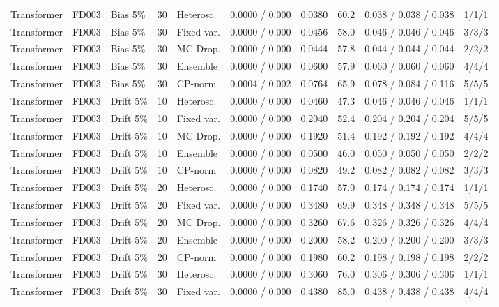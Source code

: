 \documentclass[10pt,a4paper]{article}
\begin{document}
\begin{landscape}
\begin{center}
\begin{longtable}{lllllcclll}
Transformer & FD003 & Bias 5\% & 30 & Heterosc. & 0.0000 / 0.000 & 0.0380 & 60.2 & 0.038 / 0.038 / 0.038 & 1/1/1 \\
Transformer & FD003 & Bias 5\% & 30 & Fixed var. & 0.0000 / 0.000 & 0.0456 & 58.0 & 0.046 / 0.046 / 0.046 & 3/3/3 \\
Transformer & FD003 & Bias 5\% & 30 & MC Drop. & 0.0000 / 0.000 & 0.0444 & 57.8 & 0.044 / 0.044 / 0.044 & 2/2/2 \\
Transformer & FD003 & Bias 5\% & 30 & Ensemble & 0.0000 / 0.000 & 0.0600 & 57.9 & 0.060 / 0.060 / 0.060 & 4/4/4 \\
Transformer & FD003 & Bias 5\% & 30 & CP-norm & 0.0004 / 0.002 & 0.0764 & 65.9 & 0.078 / 0.084 / 0.116 & 5/5/5 \\
Transformer & FD003 & Drift 5\% & 10 & Heterosc. & 0.0000 / 0.000 & 0.0460 & 47.3 & 0.046 / 0.046 / 0.046 & 1/1/1 \\
Transformer & FD003 & Drift 5\% & 10 & Fixed var. & 0.0000 / 0.000 & 0.2040 & 52.4 & 0.204 / 0.204 / 0.204 & 5/5/5 \\
Transformer & FD003 & Drift 5\% & 10 & MC Drop. & 0.0000 / 0.000 & 0.1920 & 51.4 & 0.192 / 0.192 / 0.192 & 4/4/4 \\
Transformer & FD003 & Drift 5\% & 10 & Ensemble & 0.0000 / 0.000 & 0.0500 & 46.0 & 0.050 / 0.050 / 0.050 & 2/2/2 \\
Transformer & FD003 & Drift 5\% & 10 & CP-norm & 0.0000 / 0.000 & 0.0820 & 49.2 & 0.082 / 0.082 / 0.082 & 3/3/3 \\
Transformer & FD003 & Drift 5\% & 20 & Heterosc. & 0.0000 / 0.000 & 0.1740 & 57.0 & 0.174 / 0.174 / 0.174 & 1/1/1 \\
Transformer & FD003 & Drift 5\% & 20 & Fixed var. & 0.0000 / 0.000 & 0.3480 & 69.9 & 0.348 / 0.348 / 0.348 & 5/5/5 \\
Transformer & FD003 & Drift 5\% & 20 & MC Drop. & 0.0000 / 0.000 & 0.3260 & 67.6 & 0.326 / 0.326 / 0.326 & 4/4/4 \\
Transformer & FD003 & Drift 5\% & 20 & Ensemble & 0.0000 / 0.000 & 0.2000 & 58.2 & 0.200 / 0.200 / 0.200 & 3/3/3 \\
Transformer & FD003 & Drift 5\% & 20 & CP-norm & 0.0000 / 0.000 & 0.1980 & 60.2 & 0.198 / 0.198 / 0.198 & 2/2/2 \\
Transformer & FD003 & Drift 5\% & 30 & Heterosc. & 0.0000 / 0.000 & 0.3060 & 76.0 & 0.306 / 0.306 / 0.306 & 1/1/1 \\
Transformer & FD003 & Drift 5\% & 30 & Fixed var. & 0.0000 / 0.000 & 0.4380 & 85.0 & 0.438 / 0.438 / 0.438 & 4/4/4 \\

\end{longtable}
\end{center}
\end{landscape}
\end{document}
